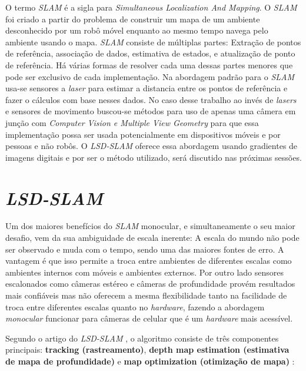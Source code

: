 O termo \textit{SLAM} é a sigla para \textit{Simultaneous Localization And Mapping}. O \textit{SLAM} foi criado a partir do problema de construir um mapa de um ambiente desconhecido por um robô móvel enquanto ao mesmo tempo navega pelo ambiente usando o mapa. \textit{SLAM} consiste de múltiplas partes: Extração de pontos de referência, associação de dados, estimativa de estados, e atualização de ponto de referência. Há várias formas de resolver cada uma dessas partes menores que pode ser exclusivo de cada implementação\cite{SLAM-Dummies}. Na abordagem padrão para o \textit{SLAM} usa-se sensores a \textit{laser} para estimar a distancia entre os pontos de referência e fazer o cálculos com base nesses dados. No caso desse trabalho ao invés de \textit{lasers} e sensores de movimento buscou-se métodos para uso de apenas uma câmera em junção com \textit{Computer Vision e Multiple View Geometry} para que essa implementação possa ser usada potencialmente em dispositivos móveis e por pessoas e não robôs. O \textit{LSD-SLAM} oferece essa abordagem usando gradientes de imagens digitais e por ser o método utilizado, será discutido nas próximas sessões.

\section{\textit{LSD-SLAM}}

Um dos maiores benefícios do \textit{SLAM} monocular, e simultaneamente o seu maior desafio, vem da sua ambiguidade de escala inerente: A escala do mundo não pode ser observado e muda com o tempo, sendo uma das maiores fontes de erro. A vantagem é que isso permite a troca entre ambientes de diferentes escalas como ambientes internos com móveis e ambientes externos. Por outro lado sensores escalonados como câmeras estéreo e câmeras de profundidade provém resultados mais confiáveis mas não oferecem a mesma flexibilidade tanto na facilidade de troca entre diferentes escalas quanto no \textit{hardware}, fazendo a abordagem \textit{monocular} funcionar para câmeras de celular que é um \textit{hardware} mais acessível. 

Segundo o artigo do \textit{LSD-SLAM} \cite{LSD-SLAM-Artigo}, o algoritmo consiste de três componentes principais: \textbf{tracking (rastreamento)}, \textbf{depth map estimation (estimativa de mapa de profundidade)} e \textbf{map optimization (otimização de mapa)} :

